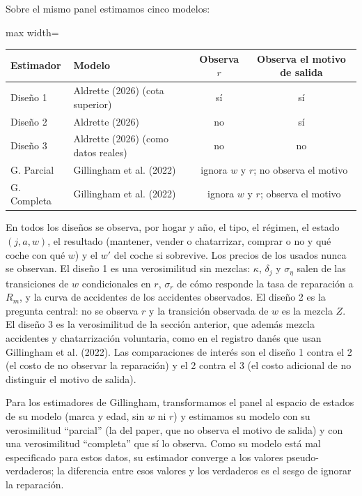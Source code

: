 \documentclass{article}
\begin{document}
Sobre el mismo panel estimamos cinco modelos:
\begin{center}
\small
\begin{adjustbox}{max width=\textwidth}
\begin{tabular}{llcc}
\toprule
Estimador & Modelo & Observa $r$ & Observa el motivo de salida\\
\midrule
Diseño 1 & Aldrette (2026) (cota superior) & sí & sí\\
Diseño 2 & Aldrette (2026) & no & sí\\
Diseño 3 & Aldrette (2026) (como datos reales) & no & no\\
G. Parcial & Gillingham et al. (2022) & \multicolumn{2}{c}{ignora $w$ y $r$; no observa el motivo}\\
G. Completa & Gillingham et al. (2022) & \multicolumn{2}{c}{ignora $w$ y $r$; observa el motivo}\\
\bottomrule
\end{tabular}
\end{adjustbox}
\end{center}
En todos los diseños se observa, por hogar y año, el tipo, el régimen, el estado $(j,a,w)$, el resultado (mantener, vender o chatarrizar, comprar o no y qué coche con qué $w$) y el $w'$ del coche si sobrevive. Los precios de los usados nunca se observan. El diseño 1 es una verosimilitud sin mezclas: $\kappa$, $\delta_j$ y $\sigma_\eta$ salen de las transiciones de $w$ condicionales en $r$, $\sigma_r$ de cómo responde la tasa de reparación a $R_m$, y la curva de accidentes de los accidentes observados. El diseño 2 es la pregunta central: no se observa $r$ y la transición observada de $w$ es la mezcla $Z$. El diseño 3 es la verosimilitud de la sección anterior, que además mezcla accidentes y chatarrización voluntaria, como en el registro danés que usan Gillingham et al. (2022). Las comparaciones de interés son el diseño 1 contra el 2 (el costo de no observar la reparación) y el 2 contra el 3 (el costo adicional de no distinguir el motivo de salida).

Para los estimadores de Gillingham, transformamos el panel al espacio de estados de su modelo (marca y edad, sin $w$ ni $r$) y estimamos su modelo con su verosimilitud ``parcial'' (la del paper, que no observa el motivo de salida) y con una verosimilitud ``completa'' que sí lo observa. Como su modelo está mal especificado para estos datos, su estimador converge a los valores pseudo-verdaderos; la diferencia entre esos valores y los verdaderos es el sesgo de ignorar la reparación.
\end{document}
